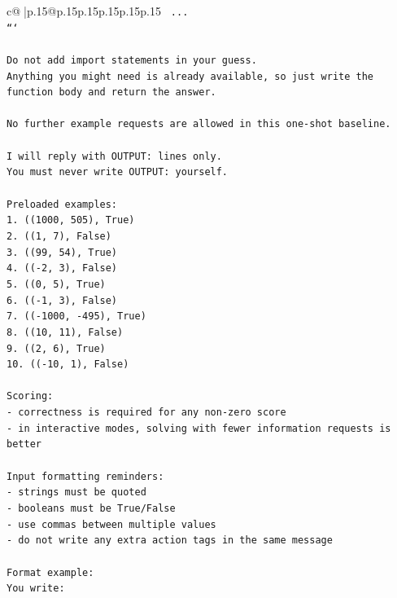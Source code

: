 \documentclass{article}
\begin{document}
{\begin{supertabular}{c@{$\;$}|p{.15\linewidth}@{}p{.15\linewidth}p{.15\linewidth}p{.15\linewidth}p{.15\linewidth}p{.15\linewidth}}
{{{\texttt{    ...} \\
\texttt{```} \\
\\ 
\texttt{Do not add import statements in your guess.} \\
\texttt{Anything you might need is already available, so just write the function body and return the answer.} \\
\\ 
\texttt{No further example requests are allowed in this one{-}shot baseline.} \\
\\ 
\texttt{I will reply with OUTPUT: lines only.} \\
\texttt{You must never write OUTPUT: yourself.} \\
\\ 
\texttt{Preloaded examples:} \\
\texttt{1. ((1000, 505), True)} \\
\texttt{2. ((1, 7), False)} \\
\texttt{3. ((99, 54), True)} \\
\texttt{4. (({-}2, 3), False)} \\
\texttt{5. ((0, 5), True)} \\
\texttt{6. (({-}1, 3), False)} \\
\texttt{7. (({-}1000, {-}495), True)} \\
\texttt{8. ((10, 11), False)} \\
\texttt{9. ((2, 6), True)} \\
\texttt{10. (({-}10, 1), False)} \\
\\ 
\texttt{Scoring:} \\
\texttt{{-} correctness is required for any non{-}zero score} \\
\texttt{{-} in interactive modes, solving with fewer information requests is better} \\
\\ 
\texttt{Input formatting reminders:} \\
\texttt{{-} strings must be quoted} \\
\texttt{{-} booleans must be True/False} \\
\texttt{{-} use commas between multiple values} \\
\texttt{{-} do not write any extra action tags in the same message} \\
\\ 
\texttt{Format example:} \\
\texttt{You write:} \\
}}}
\end{supertabular}}
\end{document}
